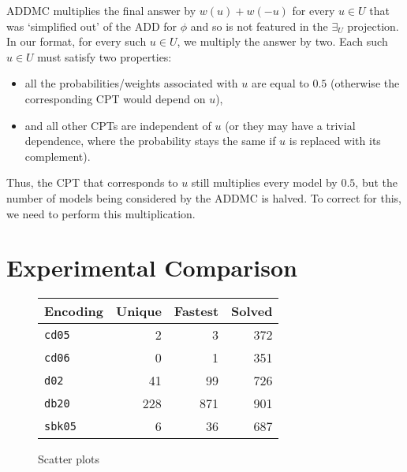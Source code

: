 \documentclass{article}
\theoremstyle{definition}
\theoremstyle{remark}
\begin{document}
ADDMC multiplies the final answer by $w(u)+w(-u)$ for every $u \in U$ that was
`simplified out' of the ADD for $\phi$ and so is not featured in the $\exists_U$
projection. In our format, for every such $u \in U$, we multiply the answer by
two. Each such $u \in U$ must satisfy two properties:
\begin{itemize}
\item all the probabilities/weights associated with $u$ are equal to $0.5$
  (otherwise the corresponding CPT would depend on $u$),
\item and all other CPTs are independent of $u$ (or they may have a trivial
  dependence, where the probability stays the same if $u$ is replaced with its
  complement).
\end{itemize}
Thus, the CPT that corresponds to $u$ still multiplies every model by $0.5$, but
the number of models being considered by the ADDMC is halved. To correct for
this, we need to perform this multiplication.

\section{Experimental Comparison} \label{sec:experiments}

\begin{figure}
  \centering
  \begin{minipage}{0.59\textwidth}
    \centering
  \end{minipage}
  \begin{minipage}{0.39\textwidth}
    \centering
    \begin{tabular}{lrrr}
      \toprule
      Encoding & Unique & Fastest & Solved \\
      \midrule
      \texttt{cd05} & 2 & 3 & 372 \\
      \texttt{cd06} & 0 & 1 & 351 \\
      \texttt{d02} & 41 & 99 & 726 \\
      \texttt{db20} & 228 & 871 & 901 \\
      \texttt{sbk05} & 6 & 36 & 687 \\
      \bottomrule
    \end{tabular}
  \end{minipage}
\end{figure}

\begin{figure}
  \centering
  \caption{Scatter plots}
\end{figure}
\end{document}
